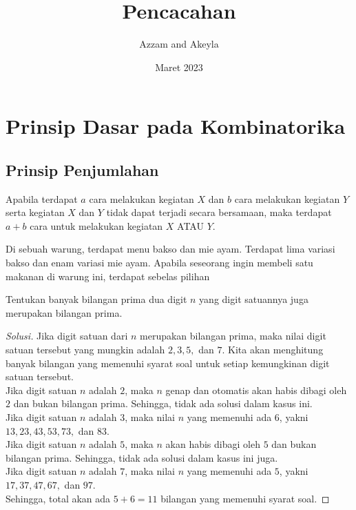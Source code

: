 \documentclass[11pt]{scrartcl}
\title{Pencacahan}
\author{Azzam and Akeyla}
\date{Maret 2023}
\begin{document}
\maketitle

\renewcommand*\contentsname{Daftar Isi}
\tableofcontents

\newpage

\section{Prinsip Dasar pada Kombinatorika}
\subsection{Prinsip Penjumlahan}
Apabila terdapat $a$ cara melakukan kegiatan $X$ dan $b$ cara melakukan kegiatan $Y$ serta kegiatan $X$ dan $Y$ tidak dapat terjadi secara bersamaan, maka terdapat $a + b$ cara untuk melakukan kegiatan $X$ ATAU $Y$.
\begin{example}
    Di sebuah warung, terdapat menu bakso dan mie ayam. Terdapat lima variasi bakso dan enam variasi mie ayam. Apabila seseorang ingin membeli satu makanan di warung ini, terdapat sebelas pilihan 
\end{example}

\begin{example}
    Tentukan banyak bilangan prima dua digit $n$ yang digit satuannya juga merupakan bilangan prima.
\end{example}

\begin{proof}[Solusi]
    Jika digit satuan dari $n$ merupakan bilangan prima, maka nilai digit satuan tersebut yang mungkin adalah $2, 3, 5,$ dan $7$. Kita akan menghitung banyak bilangan yang memenuhi syarat soal untuk setiap kemungkinan digit satuan tersebut.\\
    Jika digit satuan $n$ adalah $2$, maka $n$ genap dan otomatis akan habis dibagi oleh $2$ dan bukan bilangan prima. Sehingga, tidak ada solusi dalam kasus ini.\\
    Jika digit satuan $n$ adalah $3$, maka nilai $n$ yang memenuhi ada $6$, yakni $13, 23, 43, 53, 73,$ dan $83$.\\
    Jika digit satuan $n$ adalah $5$, maka $n$ akan habis dibagi oleh $5$ dan bukan bilangan prima. Sehingga, tidak ada solusi dalam kasus ini juga.\\
    Jika digit satuan $n$ adalah $7$, maka nilai $n$ yang memenuhi ada $5$, yakni $17, 37, 47, 67,$ dan $97$.\\
    Sehingga, total akan ada $5 + 6 = 11$ bilangan yang memenuhi syarat soal.
\end{proof}
\end{document}

